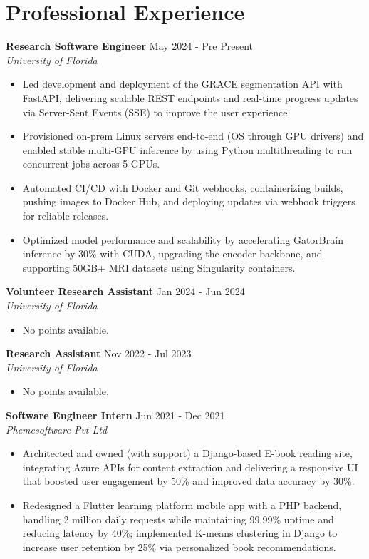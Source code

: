 \documentclass[a4paper,10pt]{article}
\begin{document}
\section*{Professional Experience}
\vspace{-3pt}
\textbf{Research Software Engineer} \hfill May 2024 - Pre Present \\
\textit{University of Florida}
\begin{itemize}
\item Led development and deployment of the GRACE segmentation API with FastAPI, delivering scalable REST endpoints and real-time progress updates via Server-Sent Events (SSE) to improve the user experience.
\item Provisioned on-prem Linux servers end-to-end (OS through GPU drivers) and enabled stable multi-GPU inference by using Python multithreading to run concurrent jobs across 5 GPUs.
\item Automated CI/CD with Docker and Git webhooks, containerizing builds, pushing images to Docker Hub, and deploying updates via webhook triggers for reliable releases.
\item Optimized model performance and scalability by accelerating GatorBrain inference by 30\% with CUDA, upgrading the encoder backbone, and supporting 50GB+ MRI datasets using Singularity containers.
\end{itemize}
\vspace{-6pt}
\textbf{Volunteer Research Assistant} \hfill Jan 2024 - Jun 2024 \\
\textit{University of Florida}
\begin{itemize}
\item No points available.
\end{itemize}
\vspace{-6pt}
\textbf{Research Assistant} \hfill Nov 2022 - Jul 2023 \\
\textit{University of Florida}
\begin{itemize}
\item No points available.
\end{itemize}
\vspace{-6pt}
\textbf{Software Engineer Intern} \hfill Jun 2021 - Dec 2021 \\
\textit{Phemesoftware Pvt Ltd}
\begin{itemize}
\item Architected and owned (with support) a Django-based E-book reading site, integrating Azure APIs for content extraction and delivering a responsive UI that boosted user engagement by 50\% and improved data accuracy by 30\%.
\item Redesigned a Flutter learning platform mobile app with a PHP backend, handling 2 million daily requests while maintaining 99.99\% uptime and reducing latency by 40\%; implemented K-means clustering in Django to increase user retention by 25\% via personalized book recommendations.
\end{itemize}
\end{document}
